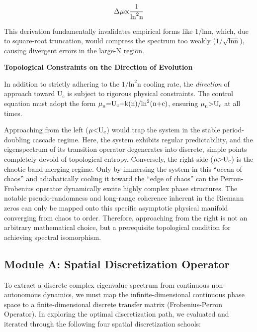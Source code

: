 \documentclass[fleqn,10pt]{wlscirep}
\begin{document}
\[\text{\ensuremath{\Delta}}\text{\ensuremath{\mu}}\text{\ensuremath{\propto}}\frac{\text{1}}{\text{ln}^{\text{2}}\text{n}}\]

This derivation fundamentally invalidates empirical forms like
\(\text{1/ln}\text{n}\), which, due to square-root truncation, would
compress the spectrum too weakly
(\(\text{1/}\sqrt{\text{ln}\text{n}}\)), causing divergent
errors in the large-N region.

\textbf{Topological Constraints on the Direction of Evolution}

In addition to strictly adhering to the
\(\text{1/}\text{ln}^{\text{2}}\text{n}\) cooling rate, the
\emph{direction} of approach toward \(\text{U}_{\text{c}}\) is subject
to rigorous physical constraints. The control equation must adopt the
form
\(\text{\ensuremath{\mu}}_{\text{n}}\text{=}\text{U}_{\text{c}}\text{+}\text{k}\text{(}\text{n}\text{)/}\text{ln}^{\text{2}}\text{(}\text{n}\text{+}\text{c}\text{)}\),
ensuring \(\text{\ensuremath{\mu}}_{\text{n}}\text{>}\text{U}_{\text{c}}\) at all
times.

Approaching from the left (\(\text{\ensuremath{\mu}}\text{<}\text{U}_{\text{c}}\))
would trap the system in the stable period-doubling cascade regime.
Here, the system exhibits regular predictability, and the eigenspectrum
of its transition operator degenerates into discrete, simple points
completely devoid of topological entropy. Conversely, the right side
(\(\text{\ensuremath{\mu}}\text{>}\text{U}_{\text{c}}\)) is the chaotic band-merging
regime. Only by immersing the system in this ``ocean of chaos'' and
adiabatically cooling it toward the ``edge of chaos'' can the
Perron-Frobenius operator dynamically excite highly complex phase
structures. The notable pseudo-randomness and long-range coherence
inherent in the Riemann zeros can only be mapped onto this specific
asymptotic physical manifold converging from chaos to order. Therefore,
approaching from the right is not an arbitrary mathematical choice, but
a prerequisite topological condition for achieving spectral isomorphism.

\subsection*{Module A: Spatial Discretization Operator}

To extract a discrete complex eigenvalue spectrum from continuous
non-autonomous dynamics, we must map the infinite-dimensional continuous
phase space to a finite-dimensional discrete transfer matrix
(Frobenius-Perron Operator). In exploring the optimal discretization
path, we evaluated and iterated through the following four spatial
discretization schools:
\end{document}
